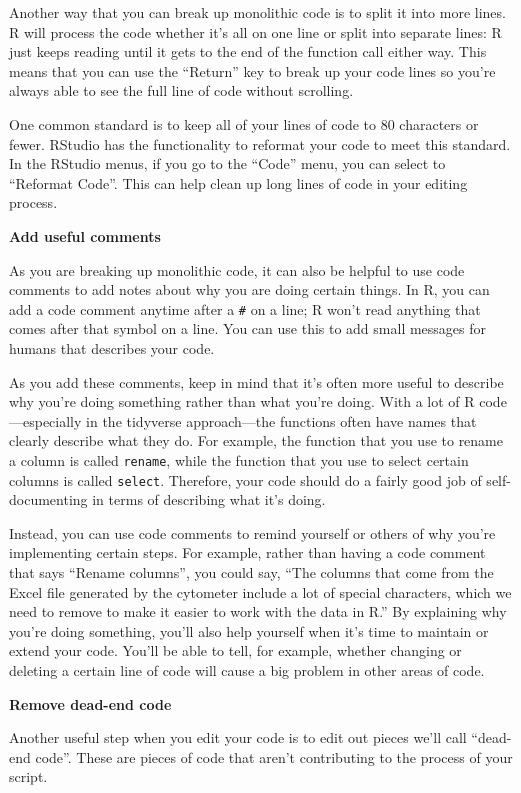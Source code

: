 \documentclass[]{tufte-book}
\begin{document}
Another way that you can break up monolithic code is to split it into more lines.
R will process the code whether it's all on one line or split into separate
lines: R just keeps reading until it gets to the end of the function call
either way. This means that you can use the ``Return'' key to break up your code
lines so you're always able to see the full line of code without scrolling.

One common standard is to keep all of your lines of code to 80 characters or
fewer. RStudio has the functionality to reformat your code to meet this
standard. In the RStudio menus, if you go to the ``Code'' menu, you can select
to ``Reformat Code''. This can help clean up long lines of code in your editing
process.

\textbf{Add useful comments}

As you are breaking up monolithic code, it can also be helpful to use
code comments to add notes about why you are doing certain things. In R, you
can add a code comment anytime after a \texttt{\#} on a line; R won't read anything
that comes after that symbol on a line. You can use this to add small messages
for humans that describes your code.

As you add these comments, keep in mind that it's often more useful to
describe why you're doing something rather than what you're doing. With a lot
of R code---especially in the tidyverse approach---the functions often have
names that clearly describe what they do. For example, the function that
you use to rename a column is called \texttt{rename}, while the function that you
use to select certain columns is called \texttt{select}. Therefore, your code should
do a fairly good job of self-documenting in terms of describing what it's
doing.

Instead, you can use code comments to remind yourself or others of
why you're implementing certain steps. For example, rather than having a code
comment that says ``Rename columns'', you could say, ``The columns that come
from the Excel file generated by the cytometer include a lot of special
characters, which we need to remove to make it easier to work with the data in
R.'' By explaining why you're doing something, you'll also help yourself when it's
time to maintain or extend your code. You'll be able to tell, for example,
whether changing or deleting a certain line of code will cause a big problem
in other areas of code.

\textbf{Remove dead-end code}

Another useful step when you edit your code is to edit out pieces we'll call
``dead-end code''. These are pieces of code that aren't contributing to the
process of your script.
\end{document}
